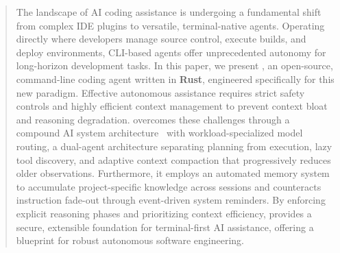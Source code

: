 \begin{abstract}
The landscape of AI coding assistance is undergoing a fundamental shift from complex IDE plugins to versatile, terminal-native agents. Operating directly where developers manage source control, execute builds, and deploy environments, CLI-based agents offer unprecedented autonomy for long-horizon development tasks. In this paper, we present \name{}, an open-source, command-line coding agent written in \textbf{Rust}, engineered specifically for this new paradigm. Effective autonomous assistance requires strict safety controls and highly efficient context management to prevent context bloat and reasoning degradation. \name{} overcomes these challenges through a compound AI system architecture~\cite{zaharia2024compound} with workload-specialized model routing, a dual-agent architecture separating planning from execution, lazy tool discovery, and adaptive context compaction that progressively reduces older observations. Furthermore, it employs an automated memory system to accumulate project-specific knowledge across sessions and counteracts instruction fade-out through event-driven system reminders. By enforcing explicit reasoning phases and prioritizing context efficiency, \name{} provides a secure, extensible foundation for terminal-first AI assistance, offering a blueprint for robust autonomous software engineering.
\end{abstract}
